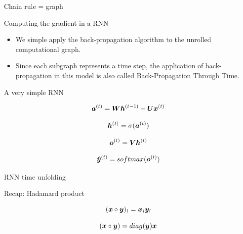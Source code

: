 \documentclass[10pt]{beamer}
\begin{document}
\begin{frame}{Chain rule = graph}

\end{frame}

\begin{frame}{Computing the gradient in a RNN}
\begin{itemize}
\item We simple apply the back-propagation algorithm to the unrolled computational graph.

\vspace{0.5cm}

\item Since each subgraph represents a time step, the application of back-propagation in this model is also called \alert{Back-Propagation Through Time}.
\end{itemize}
\end{frame}


\begin{frame}{A very simple RNN}

\Large{
\begin{equation*}
\bm{a}^{(t)} = \bm{W} \bm{h}^{(t-1)} + \bm{U} \bm{x}^{(t)}
\end{equation*}

\vspace{0.1cm}

\begin{equation*}
\bm{h}^{(t)} = \sigma(\bm{a}^{(t)})
\end{equation*}

\vspace{0.1cm}

\begin{equation*}
\bm{o}^{(t)} = \bm{V} \bm{h}^{(t)}
\end{equation*}

\vspace{0.1cm}

\begin{equation*}
\bm{\hat{y}}^{(t)} = softmax(\bm{o}^{(t)})
\end{equation*}
}

\end{frame}


\begin{frame}{RNN time unfolding}

\end{frame}

\begin{frame}{Recap: Hadamard product}
\Large{
\begin{equation*}
(\bm{x} \circ \bm{y})_{i} = \bm{x}_{i} \bm{y}_{i} 
\end{equation*}

\vspace{0.5cm}

\begin{equation*}
(\bm{x} \circ \bm{y}) = diag(\bm{y})\bm{x} 
\end{equation*}
 }
\end{frame}
\end{document}
